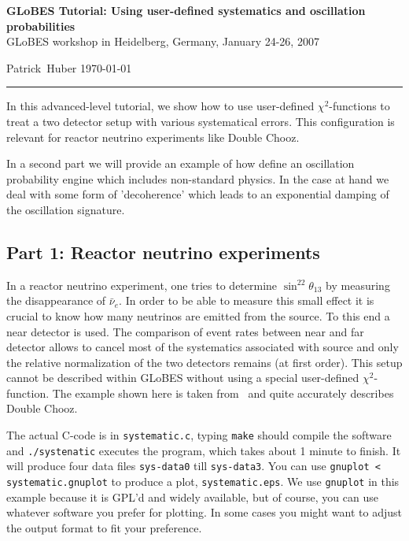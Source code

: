 \documentclass[12pt,a4paper]{article}
\begin{document}
\vspace*{-3cm}
\begin{center}
{\large\bf GLoBES Tutorial: Using user-defined systematics and
  oscillation probabilities}\\[0.3cm]
GLoBES workshop in Heidelberg, Germany, January 24-26, 2007
\end{center}
\vspace*{2mm}

Patrick\ Huber \hfill \today

\bigskip
\hrule
\vspace*{4mm}

{\small In this advanced-level tutorial, we show how to use
  user-defined $\chi^2$-functions to treat a two detector setup with
  various systematical errors. This configuration is relevant for
  reactor neutrino experiments like Double Chooz.
  
  In a second part we will provide an example of how define an
  oscillation probability engine which includes non-standard physics.
  In the case at hand we deal with some form of 'decoherence' which
  leads to an exponential damping of the oscillation signature.  }

\vspace*{0.5cm}

\subsection*{Part 1: Reactor neutrino experiments}

In a reactor neutrino experiment, one tries to determine
$\sin^22\theta_{13}$ by measuring the disappearance of $\bar\nu_e$. In
order to be able to measure this small effect it is crucial to know
how many neutrinos are emitted from the source. To this end a near
detector is used. The comparison of event rates between near and far
detector allows to cancel most of the systematics associated with
source and only the relative normalization of the two detectors remains
(at first order). This setup cannot be described within GLoBES without
using a special user-defined $\chi^2$-function. The example shown here
is taken from~\cite{Huber:2006vr} and quite accurately describes
Double Chooz.

The actual C-code is in {\tt systematic.c}, typing {\tt make} should
compile the software and {\tt ./systenatic} executes the program,
which takes about 1 minute to finish. It will produce four data files
{\tt sys-data0} till {\tt sys-data3}. You can use {\tt gnuplot <
  systematic.gnuplot} to produce a plot, {\tt systematic.eps}. We use
{\tt gnuplot} in this example because it is GPL'd and widely
available, but of course, you can use whatever software you prefer for
plotting. In some cases you might want to adjust the output format to
fit your preference.
\end{document}
